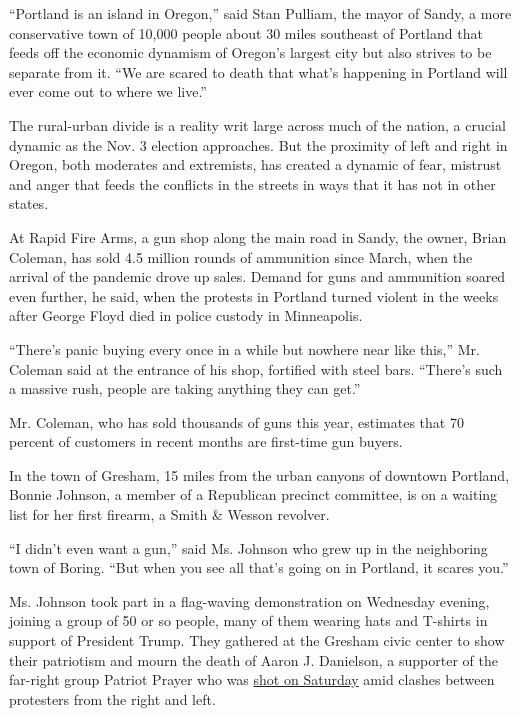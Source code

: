 ``Portland is an island in Oregon,'' said Stan Pulliam, the mayor of
Sandy, a more conservative town of 10,000 people about 30 miles
southeast of Portland that feeds off the economic dynamism of Oregon's
largest city but also strives to be separate from it. ``We are scared to
death that what's happening in Portland will ever come out to where we
live.''

The rural-urban divide is a reality writ large across much of the
nation, a crucial dynamic as the Nov. 3 election approaches. But the
proximity of left and right in Oregon, both moderates and extremists,
has created a dynamic of fear, mistrust and anger that feeds the
conflicts in the streets in ways that it has not in other states.

At Rapid Fire Arms, a gun shop along the main road in Sandy, the owner,
Brian Coleman, has sold 4.5 million rounds of ammunition since March,
when the arrival of the pandemic drove up sales. Demand for guns and
ammunition soared even further, he said, when the protests in Portland
turned violent in the weeks after George Floyd died in police custody in
Minneapolis.

``There's panic buying every once in a while but nowhere near like
this,'' Mr. Coleman said at the entrance of his shop, fortified with
steel bars. ``There's such a massive rush, people are taking anything
they can get.''

Mr. Coleman, who has sold thousands of guns this year, estimates that 70
percent of customers in recent months are first-time gun buyers.

In the town of Gresham, 15 miles from the urban canyons of downtown
Portland, Bonnie Johnson, a member of a Republican precinct committee,
is on a waiting list for her first firearm, a Smith \& Wesson revolver.

``I didn't even want a gun,'' said Ms. Johnson who grew up in the
neighboring town of Boring. ``But when you see all that's going on in
Portland, it scares you.''

Ms. Johnson took part in a flag-waving demonstration on Wednesday
evening, joining a group of 50 or so people, many of them wearing hats
and T-shirts in support of President Trump. They gathered at the Gresham
civic center to show their patriotism and mourn the death of Aaron J.
Danielson, a supporter of the far-right group Patriot Prayer who was
\href{https://www.nytimes3xbfgragh.onion/2020/08/30/us/portland-trump-rally-shooting.html}{shot
on Saturday} amid clashes between protesters from the right and left.

